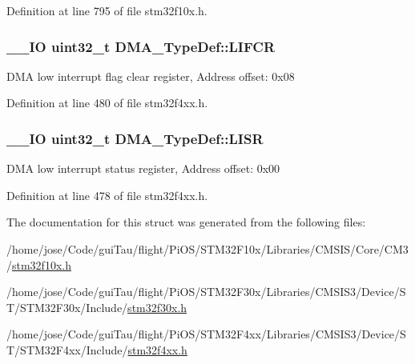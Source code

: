 Definition at line 795 of file stm32f10x.\-h.

\hypertarget{struct_d_m_a___type_def_a11adb689c874d38b49fa44990323b653}{
\subsubsection[{L\-I\-F\-C\-R}]{\setlength{\rightskip}{0pt plus 5cm}\-\_\-\-\_\-\-I\-O {\bf uint32\-\_\-t} D\-M\-A\-\_\-\-Type\-Def\-::\-L\-I\-F\-C\-R}}\label{struct_d_m_a___type_def_a11adb689c874d38b49fa44990323b653}
D\-M\-A low interrupt flag clear register, Address offset\-: 0x08 

Definition at line 480 of file stm32f4xx.\-h.

\hypertarget{struct_d_m_a___type_def_aacb4a0977d281bc809cb5974e178bc2b}{
\subsubsection[{L\-I\-S\-R}]{\setlength{\rightskip}{0pt plus 5cm}\-\_\-\-\_\-\-I\-O {\bf uint32\-\_\-t} D\-M\-A\-\_\-\-Type\-Def\-::\-L\-I\-S\-R}}\label{struct_d_m_a___type_def_aacb4a0977d281bc809cb5974e178bc2b}
D\-M\-A low interrupt status register, Address offset\-: 0x00 

Definition at line 478 of file stm32f4xx.\-h.



The documentation for this struct was generated from the following files\-:\begin{DoxyCompactItemize}
\item 
/home/jose/\-Code/gui\-Tau/flight/\-Pi\-O\-S/\-S\-T\-M32\-F10x/\-Libraries/\-C\-M\-S\-I\-S/\-Core/\-C\-M3/\hyperlink{stm32f10x_8h}{stm32f10x.\-h}\item 
/home/jose/\-Code/gui\-Tau/flight/\-Pi\-O\-S/\-S\-T\-M32\-F30x/\-Libraries/\-C\-M\-S\-I\-S3/\-Device/\-S\-T/\-S\-T\-M32\-F30x/\-Include/\hyperlink{stm32f30x_8h}{stm32f30x.\-h}\item 
/home/jose/\-Code/gui\-Tau/flight/\-Pi\-O\-S/\-S\-T\-M32\-F4xx/\-Libraries/\-C\-M\-S\-I\-S3/\-Device/\-S\-T/\-S\-T\-M32\-F4xx/\-Include/\hyperlink{stm32f4xx_8h}{stm32f4xx.\-h}\end{DoxyCompactItemize}
